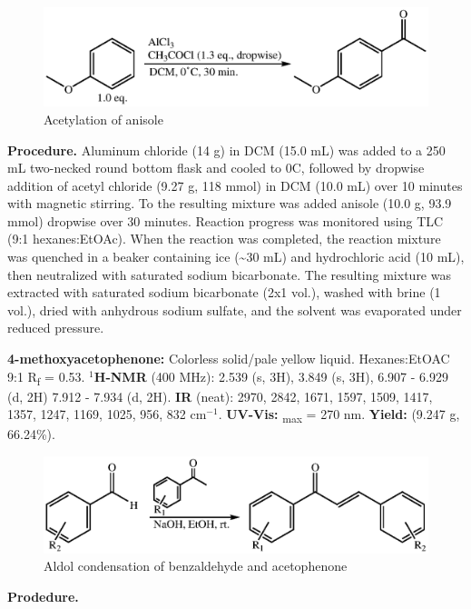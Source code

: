 \documentclass[12pt]{article}
\let\bf\textbf
\begin{document}
\begin{figure}[ht]
    \centering
    \includegraphics[scale=0.8]{schemes/acetylation.eps}
    \caption{Acetylation of anisole}
\end{figure}
\noindent\bf{Procedure.} Aluminum chloride (14 g) in DCM (15.0 mL) was added to a 250 mL two-necked round bottom flask and cooled to 0\degree C, followed by dropwise addition of acetyl chloride (9.27 g, 118 mmol) in DCM (10.0 mL) over 10 minutes with magnetic stirring. To the resulting mixture was added anisole (10.0 g, 93.9 mmol) dropwise over 30 minutes. Reaction progress was monitored using TLC (9:1 hexanes:EtOAc). When the reaction was completed, the reaction mixture was quenched in a beaker containing ice (\textasciitilde 30 mL) and hydrochloric acid (10 mL), then neutralized with saturated sodium bicarbonate. The resulting mixture was extracted with saturated sodium bicarbonate (2x1 vol.), washed with brine (1 vol.), dried with anhydrous sodium sulfate, and the solvent was evaporated under reduced pressure.

\noindent\bf{4-methoxyacetophenone:} Colorless solid/pale yellow liquid. Hexanes:EtOAC 9:1 R\textsubscript{f} = 0.53. \bf{$^1$H-NMR} (400 MHz): \textdelta\hspace{0mm} 2.539 (s, 3H), 3.849 (s, 3H), 6.907 - 6.929 (d, 2H) 7.912 - 7.934 (d, 2H). \bf{IR} (neat): 2970, 2842, 1671, 1597, 1509, 1417, 1357, 1247, 1169, 1025, 956, 832 cm$^{-1}$. \bf{UV-Vis:} \textlambda\textsubscript{max} = 270 nm. \bf{Yield:} (9.247 g, 66.24\%).

\begin{figure}[H]
    \centering
    \includegraphics[scale=0.8]{schemes/chalcone.eps}
    \caption{Aldol condensation of benzaldehyde and acetophenone}
\end{figure}
\noindent\bf{Prodedure.}
\end{document}

